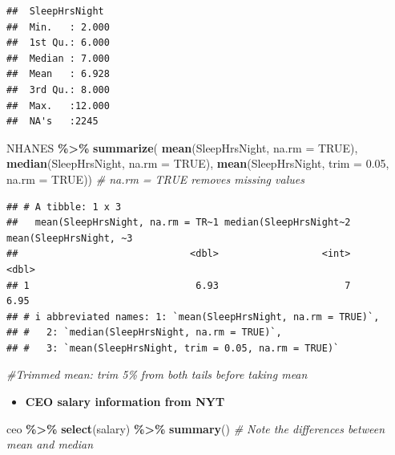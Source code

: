 \documentclass[
]{book}
\newenvironment{Shaded}{\begin{snugshade}}{\end{snugshade}}
\newcommand{\AttributeTok}[1]{\textcolor[rgb]{0.13,0.29,0.53}{#1}}
\newcommand{\CommentTok}[1]{\textcolor[rgb]{0.56,0.35,0.01}{\textit{#1}}}
\newcommand{\ConstantTok}[1]{\textcolor[rgb]{0.56,0.35,0.01}{#1}}
\newcommand{\FloatTok}[1]{\textcolor[rgb]{0.00,0.00,0.81}{#1}}
\newcommand{\FunctionTok}[1]{\textcolor[rgb]{0.13,0.29,0.53}{\textbf{#1}}}
\newcommand{\NormalTok}[1]{#1}
\newcommand{\SpecialCharTok}[1]{\textcolor[rgb]{0.81,0.36,0.00}{\textbf{#1}}}
\providecommand{\tightlist}{%
  \setlength{\itemsep}{0pt}\setlength{\parskip}{0pt}}
\begin{document}
\begin{verbatim}
##  SleepHrsNight   
##  Min.   : 2.000  
##  1st Qu.: 6.000  
##  Median : 7.000  
##  Mean   : 6.928  
##  3rd Qu.: 8.000  
##  Max.   :12.000  
##  NA's   :2245
\end{verbatim}

\begin{Shaded}
\begin{Highlighting}[]
\NormalTok{NHANES }\SpecialCharTok{\%\textgreater{}\%}
  \FunctionTok{summarize}\NormalTok{(}
    \FunctionTok{mean}\NormalTok{(SleepHrsNight, }\AttributeTok{na.rm =} \ConstantTok{TRUE}\NormalTok{),}
    \FunctionTok{median}\NormalTok{(SleepHrsNight, }\AttributeTok{na.rm =} \ConstantTok{TRUE}\NormalTok{), }
    \FunctionTok{mean}\NormalTok{(SleepHrsNight, }\AttributeTok{trim =} \FloatTok{0.05}\NormalTok{, }\AttributeTok{na.rm =} \ConstantTok{TRUE}\NormalTok{)) }\CommentTok{\# na.rm = TRUE removes missing values }
\end{Highlighting}
\end{Shaded}

\begin{verbatim}
## # A tibble: 1 x 3
##   mean(SleepHrsNight, na.rm = TR~1 median(SleepHrsNight~2 mean(SleepHrsNight, ~3
##                              <dbl>                  <int>                  <dbl>
## 1                             6.93                      7                   6.95
## # i abbreviated names: 1: `mean(SleepHrsNight, na.rm = TRUE)`,
## #   2: `median(SleepHrsNight, na.rm = TRUE)`,
## #   3: `mean(SleepHrsNight, trim = 0.05, na.rm = TRUE)`
\end{verbatim}

\begin{Shaded}
\begin{Highlighting}[]
\CommentTok{\#Trimmed mean: trim 5\% from both tails before taking mean}
\end{Highlighting}
\end{Shaded}

\begin{itemize}
\tightlist
\item
  \textbf{CEO salary information from NYT}
\end{itemize}

\begin{Shaded}
\begin{Highlighting}[]
\NormalTok{ceo }\SpecialCharTok{\%\textgreater{}\%}
  \FunctionTok{select}\NormalTok{(salary) }\SpecialCharTok{\%\textgreater{}\%}
  \FunctionTok{summary}\NormalTok{()  }\CommentTok{\# Note the differences between mean and median}
\end{Highlighting}
\end{Shaded}
\end{document}
